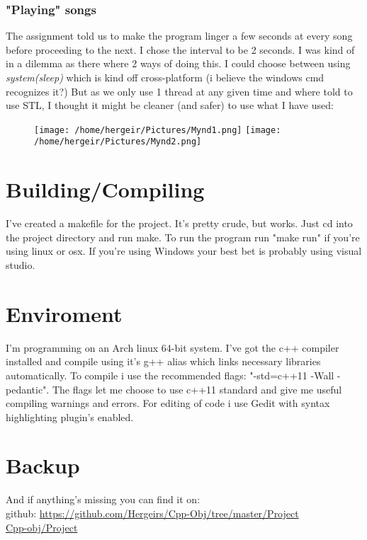 \documentclass[11pt]{article}
\begin{document}
\subsubsection{"Playing" songs}
The assignment told us to make the program linger a few seconds at every song before proceeding to the next. I chose the interval to be 2 seconds. I was kind of in a dilemma as there where 2 ways of doing this. I could choose between using \emph{system(sleep)} which is kind off cross-platform (i believe the windows cmd recognizes it?) But as we only use 1 thread at any given time and where told to use STL, I thought it might be cleaner (and safer) to use what I have used:
\begin{figure}[htp]
\centering
\texttt{[image: /home/hergeir/Pictures/Mynd1.png]}
\texttt{[image: /home/hergeir/Pictures/Mynd2.png]}
\caption{}
\label{}
\end{figure}

\section{Building/Compiling}
I've created a makefile for the project. It's pretty crude, but works. 
Just cd into the project directory and run make. To run the program run "make run" if you're using linux or osx. If you're using Windows your best bet is probably using visual studio.

\section{Enviroment}
I'm programming on an Arch linux 64-bit system. I've got the c++ compiler installed and compile using it's g++ alias which links necessary libraries automatically. To compile i use the recommended flags: "-std=c++11 -Wall -pedantic". The flags let me choose to use c++11 standard and give me useful compiling warnings and errors. 
For editing of code i use Gedit with syntax highlighting plugin's enabled.

\section{Backup}
And if anything's missing you can find it on: \\
github: \url{https://github.com/Hergeirs/Cpp-Obj/tree/master/Project} \\
\href{https://github.com/Hergeirs/Cpp-Obj/tree/master/Project}{Cpp-obj/Project}



\flushright{\today}
\end{document}
